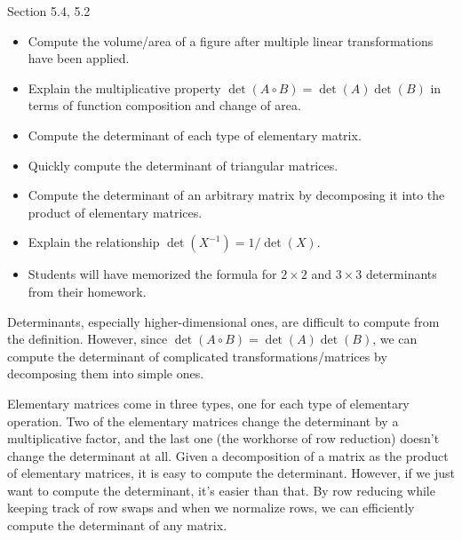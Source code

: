 \documentclass{problemset}
\begin{document}
\begin{lesson}

	Section 5.4, 5.2

	\begin{itemize}
		\item Compute the volume/area of a figure after multiple linear transformations
			have been applied.
		\item Explain the multiplicative property $\det(A\circ B)=\det(A)\det(B)$ in terms
			of function composition and change of area.
		\item Compute the determinant of each type of elementary matrix.
		\item Quickly compute the determinant of triangular matrices.
		\item Compute the determinant of an arbitrary matrix by decomposing it into the product of elementary matrices.
		\item Explain the relationship $\det(X^{-1})=1/\det(X)$.
	\end{itemize}

	\begin{annotation}
		\begin{notes}
			\begin{itemize}
				\item Students will have memorized the formula for $2\times 2$ and $3\times 3$ determinants
					from their homework.
			\end{itemize}
		\end{notes}
	\end{annotation}
	Determinants, especially higher-dimensional ones, are difficult to compute from the definition. However,
	since $\det(A\circ B)=\det(A)\det(B)$, we can compute the determinant of complicated transformations/matrices
	by decomposing them into simple ones.

	Elementary matrices come in three types, one for each type of elementary operation. Two of the elementary
	matrices change the determinant by a multiplicative factor, and the last one (the workhorse of row reduction) doesn't
	change the determinant at all. Given a decomposition of a matrix as the product of elementary matrices,
	it is easy to compute the determinant. However, if we just want to compute the determinant, it's easier than that.
	By row reducing while keeping track of row swaps and when
	we normalize rows, we can efficiently compute the determinant of any matrix.


\end{lesson}
\end{document}

